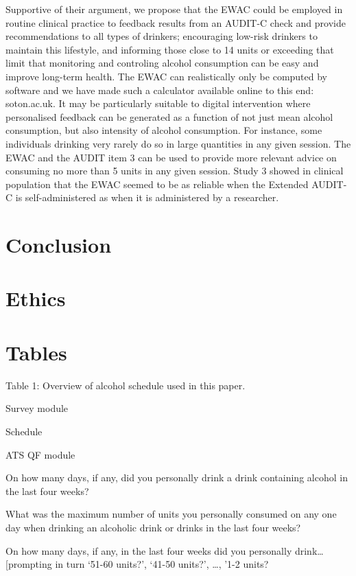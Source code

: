 \documentclass[]{article}
\begin{document}
Supportive of their argument, we propose that the EWAC could be employed
in routine clinical practice to feedback results from an AUDIT-C check
and provide recommendations to all types of drinkers; encouraging
low-risk drinkers to maintain this lifestyle, and informing those close
to 14 units or exceeding that limit that monitoring and controling
alcohol consumption can be easy and improve long-term health. The EWAC
can realistically only be computed by software and we have made such a
calculator available online to this end: soton.ac.uk. It may be
particularly suitable to digital intervention where personalised
feedback can be generated as a function of not just mean alcohol
consumption, but also intensity of alcohol consumption. For instance,
some individuals drinking very rarely do so in large quantities in any
given session. The EWAC and the AUDIT item 3 can be used to provide more
relevant advice on consuming no more than 5 units in any given session.
Study 3 showed in clinical population that the EWAC seemed to be as
reliable when the Extended AUDIT-C is self-administered as when it is
administered by a researcher.

\hypertarget{conclusion}{%
\section{Conclusion}\label{conclusion}}

\hypertarget{ethics}{%
\section{Ethics}\label{ethics}}

\hypertarget{tables}{%
\section{Tables}\label{tables}}

Table 1: Overview of alcohol schedule used in this paper.

Survey module

Schedule

ATS QF module

On how many days, if any, did you personally drink a drink containing
alcohol in the last four weeks?

What was the maximum number of units you personally consumed on any one
day when drinking an alcoholic drink or drinks in the last four weeks?

On how many days, if any, in the last four weeks did you personally
drink\ldots{} {[}prompting in turn `51-60 units?', `41-50 units?',
\ldots{}, '1-2 units?
\end{document}
